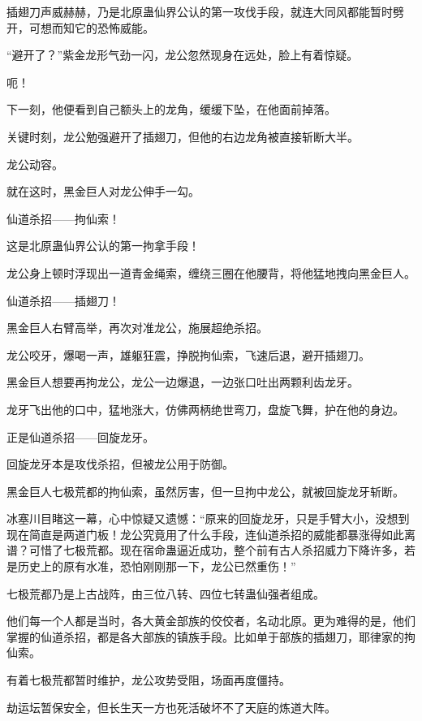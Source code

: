 
\begin{this_body}

插翅刀声威赫赫，乃是北原蛊仙界公认的第一攻伐手段，就连大同风都能暂时劈开，可想而知它的恐怖威能。

“避开了？”紫金龙形气劲一闪，龙公忽然现身在远处，脸上有着惊疑。

呃！

下一刻，他便看到自己额头上的龙角，缓缓下坠，在他面前掉落。

关键时刻，龙公勉强避开了插翅刀，但他的右边龙角被直接斩断大半。

龙公动容。

就在这时，黑金巨人对龙公伸手一勾。

仙道杀招——拘仙索！

这是北原蛊仙界公认的第一拘拿手段！

龙公身上顿时浮现出一道青金绳索，缠绕三圈在他腰背，将他猛地拽向黑金巨人。

仙道杀招——插翅刀！

黑金巨人右臂高举，再次对准龙公，施展超绝杀招。

龙公咬牙，爆喝一声，雄躯狂震，挣脱拘仙索，飞速后退，避开插翅刀。

黑金巨人想要再拘龙公，龙公一边爆退，一边张口吐出两颗利齿龙牙。

龙牙飞出他的口中，猛地涨大，仿佛两柄绝世弯刀，盘旋飞舞，护在他的身边。

正是仙道杀招——回旋龙牙。

回旋龙牙本是攻伐杀招，但被龙公用于防御。

黑金巨人七极荒都的拘仙索，虽然厉害，但一旦拘中龙公，就被回旋龙牙斩断。

冰塞川目睹这一幕，心中惊疑又遗憾：“原来的回旋龙牙，只是手臂大小，没想到现在简直是两道门板！龙公究竟用了什么手段，连仙道杀招的威能都暴涨得如此离谱？可惜了七极荒都。现在宿命蛊逼近成功，整个前有古人杀招威力下降许多，若是历史上的原有水准，恐怕刚刚那一下，龙公已然重伤！”

七极荒都乃是上古战阵，由三位八转、四位七转蛊仙强者组成。

他们每一个人都是当时，各大黄金部族的佼佼者，名动北原。更为难得的是，他们掌握的仙道杀招，都是各大部族的镇族手段。比如单于部族的插翅刀，耶律家的拘仙索。

有着七极荒都暂时维护，龙公攻势受阻，场面再度僵持。

劫运坛暂保安全，但长生天一方也死活破坏不了天庭的炼道大阵。


\end{this_body}
